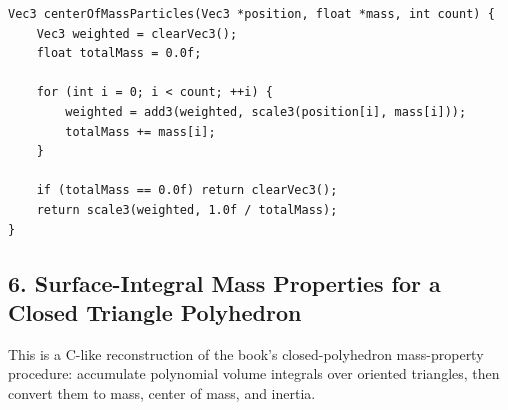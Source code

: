 \documentclass[10pt,letterpaper]{article}
\begin{document}
\begin{verbatim}
Vec3 centerOfMassParticles(Vec3 *position, float *mass, int count) {
    Vec3 weighted = clearVec3();
    float totalMass = 0.0f;

    for (int i = 0; i < count; ++i) {
        weighted = add3(weighted, scale3(position[i], mass[i]));
        totalMass += mass[i];
    }

    if (totalMass == 0.0f) return clearVec3();
    return scale3(weighted, 1.0f / totalMass);
}
\end{verbatim}

\subsection*{6. Surface-Integral Mass Properties for a Closed Triangle Polyhedron}

This is a C-like reconstruction of the book's closed-polyhedron mass-property procedure: accumulate polynomial volume integrals over oriented triangles, then convert them to mass, center of mass, and inertia.
\end{document}
